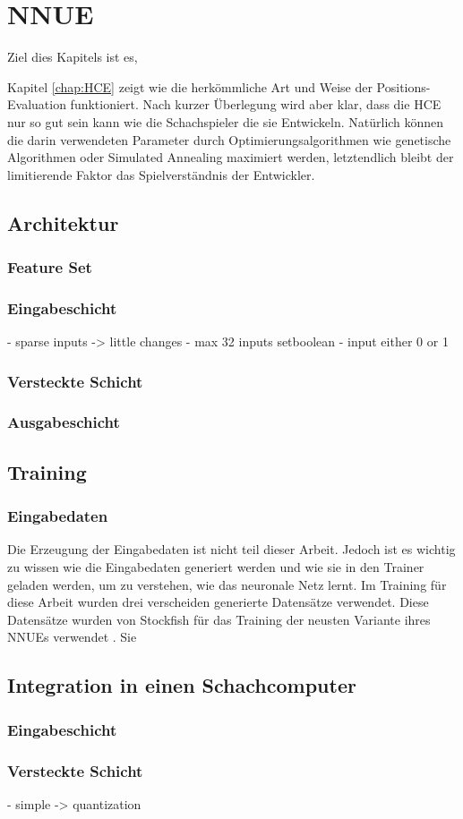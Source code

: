 \chapter{NNUE}

Ziel dies Kapitels ist es, 

Kapitel \autoref{chap:HCE} zeigt wie die herkömmliche Art und Weise der Positions-Evaluation funktioniert. Nach kurzer Überlegung wird aber klar, dass die \ac{HCE} nur so gut sein kann wie die Schachspieler die sie Entwickeln. Natürlich können die darin verwendeten Parameter durch Optimierungsalgorithmen wie genetische Algorithmen oder Simulated Annealing maximiert werden, letztendlich bleibt der limitierende Faktor das Spielverständnis der Entwickler.


\section{Architektur}

\subsection{Feature Set}

\subsection{Eingabeschicht}

- sparse inputs -> little changes
- max 32 inputs setboolean
- input either 0 or 1

\subsection{Versteckte Schicht}
\subsection{Ausgabeschicht}

\section{Training}

\subsection{Eingabedaten}

Die Erzeugung der Eingabedaten ist nicht teil dieser Arbeit. Jedoch ist es wichtig zu wissen wie die Eingabedaten generiert werden und wie sie in den Trainer geladen werden, um zu verstehen, wie das neuronale Netz lernt. Im Training für diese Arbeit wurden drei verscheiden generierte Datensätze verwendet. Diese Datensätze wurden von Stockfish für das Training der neusten Variante ihres \acp{NNUE} verwendet \cite{StockfishNewesNetJul04}. Sie 

\section{Integration in einen Schachcomputer}

\subsection{Eingabeschicht}


\subsection{Versteckte Schicht}
- simple -> quantization